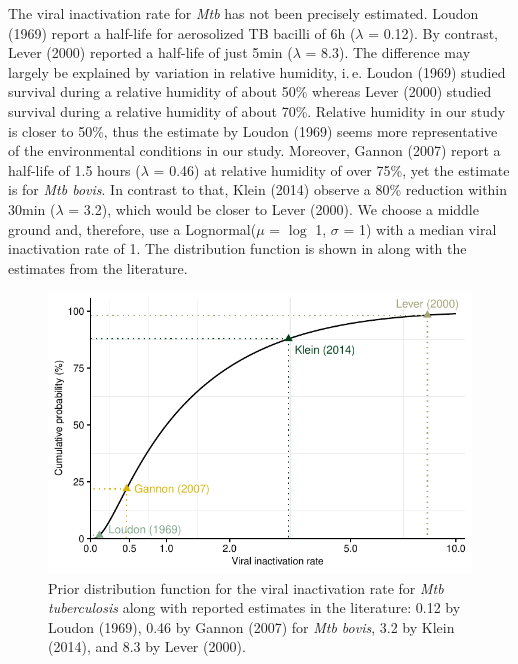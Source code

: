 \documentclass[fleqn,11pt]{wlscirep_supp}
\newcommand\ie{i.\,e.\xspace}
\begin{document}

The viral inactivation rate for \emph{Mtb} has not been precisely estimated. Loudon (1969)\cite{Loudon1969AMRRD} report a half-life for aerosolized TB bacilli of 6h ($\lambda$ = 0.12). By contrast, Lever (2000)\cite{Lever2000LettersAppliedMicrobio} reported a half-life of just 5min ($\lambda$ = 8.3). The difference may largely be explained by variation in relative humidity, \ie Loudon (1969) studied survival during a relative humidity of about 50\% whereas Lever (2000) studied survival during a relative humidity of about 70\%. Relative humidity in our study is closer to 50\%, thus the estimate by Loudon (1969) seems more representative of the environmental conditions in our study.  Moreover, Gannon (2007)\cite{Gannon2007ResVetSci} report a half-life of 1.5 hours ($\lambda$ = 0.46) at relative humidity of over 75\%, yet the estimate is for \emph{Mtb bovis}. In contrast to that, Klein (2014)\cite{Klein2014IJMyco} observe a 80\% reduction within 30min ($\lambda$ = 3.2), which would be closer to Lever (2000). We choose a middle ground and, therefore, use a Lognormal($\mu$ = $\log$ 1, $\sigma$ = 1) with a median viral inactivation rate of 1. The distribution function is shown in  along with the estimates from the literature.

\begin{figure}[!htpb]
    \centering
    \includegraphics{illustrations/prior-lambda.pdf}
    \caption{Prior distribution function for the viral inactivation rate for \emph{Mtb tuberculosis} along with reported estimates in the literature: 0.12 by Loudon (1969)\cite{Loudon1969AMRRD}, 0.46 by Gannon (2007) for \emph{Mtb bovis}\cite{Gannon2007ResVetSci}, 3.2 by Klein (2014)\cite{Klein2014IJMyco}, and 8.3 by Lever (2000)\cite{Lever2000LettersAppliedMicrobio}.}
    \label{fig:lambda-distribution}
\end{figure}
\end{document}
